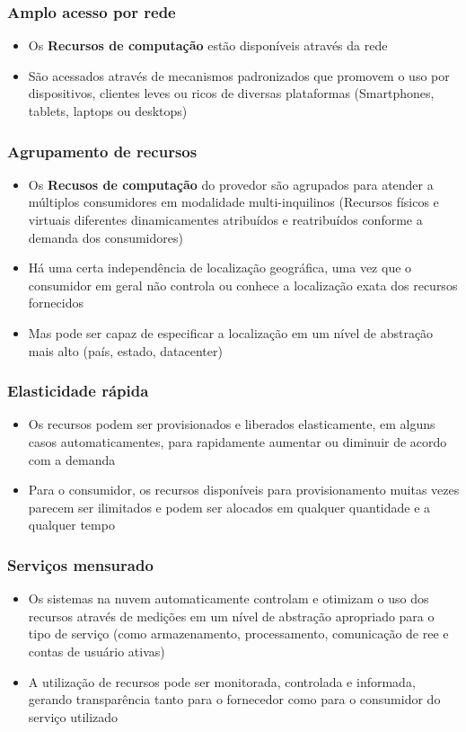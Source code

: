 \begin{frame}
	\frametitle{Amplo acesso por rede}
	\begin{itemize}
		\item Os \textbf{Recursos de computação} estão disponíveis através da rede
		\item São acessados através de mecanismos padronizados que promovem o uso por dispositivos, clientes leves ou ricos de diversas plataformas (Smartphones, tablets, laptops ou desktops)
	\end{itemize}
\end{frame}

\begin{frame}
	\frametitle{Agrupamento de recursos}
	\begin{itemize}
		\item Os \textbf{Recusos de computação} do provedor são agrupados para atender a múltiplos consumidores em modalidade multi-inquilinos (Recursos físicos e virtuais diferentes dinamicamentes atribuídos e reatribuídos conforme a demanda dos consumidores)
		\item Há uma certa independência de localização geográfica, uma vez que o consumidor em geral não controla ou conhece a localização exata dos recursos fornecidos
		\item Mas pode ser capaz de especificar a localização em um nível de abstração mais alto (país, estado, datacenter)
	\end{itemize}
\end{frame}

\begin{frame}
	\frametitle{Elasticidade rápida}
	\begin{itemize}
		\item Os recursos podem ser provisionados e liberados elasticamente, em alguns casos automaticamentes, para rapidamente aumentar ou diminuir de acordo com a demanda
		\item Para o consumidor, os recursos disponíveis para provisionamento muitas vezes parecem ser ilimitados e podem ser alocados em qualquer quantidade e a qualquer tempo
	\end{itemize}
\end{frame}

\begin{frame}
	\frametitle{Serviços mensurado}
	\begin{itemize}
		\item Os sistemas na nuvem automaticamente controlam e otimizam o uso dos recursos através de medições em um nível de abstração apropriado para o tipo de serviço (como armazenamento, processamento, comunicação de ree e contas de usuário ativas)
		\item A utilização de recursos pode ser monitorada, controlada e informada, gerando transparência tanto para o fornecedor como para o consumidor do serviço utilizado
	\end{itemize}
\end{frame}

